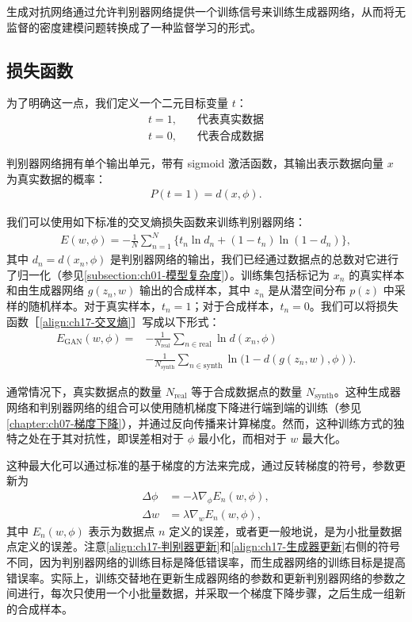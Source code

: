 \documentclass[../../main.tex]{subfiles}
\begin{document}
生成对抗网络通过允许判别器网络提供一个训练信号来训练生成器网络，从而将无监督的密度建模问题转换成了一种监督学习的形式。

\subsection{损失函数}\label{subsection:ch17-损失函数}

为了明确这一点，我们定义一个二元目标变量 $t$：
\begin{align}
t=1,&\quad\text{代表真实数据}\label{align:ch17-t真实}\\
t=0,&\quad\text{代表合成数据}\label{align:ch17-t合成}
\end{align}

判别器网络拥有单个输出单元，带有 sigmoid 激活函数，其输出表示数据向量 $x$ 为真实数据的概率：
\begin{align}
P(t=1)=d(x,\phi).
\label{align:ch17-判别器输出}
\end{align}

我们可以使用如下标准的交叉熵损失函数来训练判别器网络：
\begin{align}
E(w,\phi)=-\frac{1}{N}\sum_{n=1}^{N}\Big\{t_n\ln d_n+(1-t_n)\ln(1-d_n)\Big\},
\label{align:ch17-交叉熵}
\end{align}
其中 $d_n=d(x_n,\phi)$ 是判别器网络的输出，我们已经通过数据点的总数对它进行了归一化（参见\cref{subsection:ch01-模型复杂度}）。训练集包括标记为 $x_n$ 的真实样本和由生成器网络 $g(z_n,w)$ 输出的合成样本，其中 $z_n$ 是从潜空间分布 $p(z)$ 中采样的随机样本。对于真实样本，$t_n=1$；对于合成样本，$t_n=0$。我们可以将损失函数［\eqref{align:ch17-交叉熵}］写成以下形式：
\begin{align}
E_{\mathrm{GAN}}(w,\phi)={}&-\frac{1}{N_{\mathrm{real}}}\sum_{n\in\mathrm{real}}\ln d(x_n,\phi)\nonumber\\
&-\frac{1}{N_{\mathrm{synth}}}\sum_{n\in\mathrm{synth}}\ln\big(1-d(g(z_n,w),\phi)\big).
\label{align:ch17-GAN损失}
\end{align}

通常情况下，真实数据点的数量 $N_{\mathrm{real}}$ 等于合成数据点的数量 $N_{\mathrm{synth}}$。这种生成器网络和判别器网络的组合可以使用随机梯度下降进行端到端的训练（参见\cref{chapter:ch07-梯度下降}），并通过反向传播来计算梯度。然而，这种训练方式的独特之处在于其对抗性，即误差相对于 $\phi$ 最小化，而相对于 $w$ 最大化。

这种最大化可以通过标准的基于梯度的方法来完成，通过反转梯度的符号，参数更新为
\begin{align}
\Delta\phi&=-\lambda\nabla_\phi E_n(w,\phi),\label{align:ch17-判别器更新}\\
\Delta w&=\lambda\nabla_w E_n(w,\phi),\label{align:ch17-生成器更新}
\end{align}
其中 $E_n(w,\phi)$ 表示为数据点 $n$ 定义的误差，或者更一般地说，是为小批量数据点定义的误差。注意\eqref{align:ch17-判别器更新}和\eqref{align:ch17-生成器更新}右侧的符号不同，因为判别器网络的训练目标是降低错误率，而生成器网络的训练目标是提高错误率。实际上，训练交替地在更新生成器网络的参数和更新判别器网络的参数之间进行，每次只使用一个小批量数据，并采取一个梯度下降步骤，之后生成一组新的合成样本。
\end{document}
